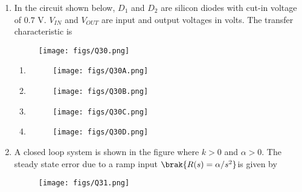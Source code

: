 \documentclass[a4paper, 11pt]{article}
\begin{document}
\begin{enumerate}
    \item In the circuit shown below, $D_1$ and $D_2$ are silicon diodes with cut-in voltage of $0.7$ V. $V_{IN}$ and $V_{OUT}$ are input and output voltages in volts. The transfer characteristic is
    \begin{figure}[H]
        \centering
        \texttt{[image: figs/Q30.png]}
        \caption*{}
        \label{fig:q40}
    \end{figure}
    
    \begin{enumerate}
        \item \begin{figure}[H] \centering \texttt{[image: figs/Q30A.png]} \caption*{} \label{fig:q40a} \end{figure}
        \item \begin{figure}[H] \centering \texttt{[image: figs/Q30B.png]} \caption*{} \label{fig:q40b} \end{figure}
        \item \begin{figure}[H] \centering \texttt{[image: figs/Q30C.png]} \caption*{} \label{fig:q40c} \end{figure}
        \item \begin{figure}[H] \centering \texttt{[image: figs/Q30D.png]} \caption*{} \label{fig:q40d} \end{figure}
    \end{enumerate}

    \hfill{}
    
    \item A closed loop system is shown in the figure where $k>0$ and $\alpha>0$. The steady state error due to a ramp input $\brak{R(s)=\alpha/s^2} $is given by
    \begin{figure}[H]
        \centering
        \texttt{[image: figs/Q31.png]}
        \caption*{}
        \label{fig:q41}
    \end{figure}
    \begin{enumerate}
    \end{enumerate}


\end{enumerate}
\end{document}
